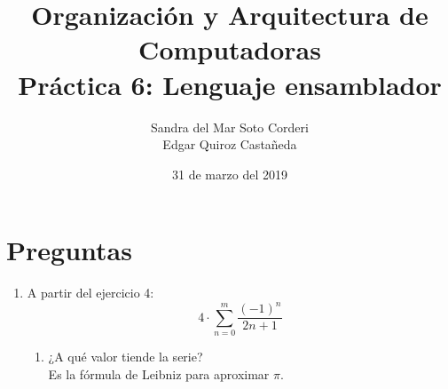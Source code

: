 \documentclass{article}
\begin{document}
    \title{
        Organización y Arquitectura de Computadoras \\
        Práctica 6: Lenguaje ensamblador \\
    }
    \date{
        31 de marzo del 2019
    }
    \author{
        Sandra del Mar Soto Corderi \\
        Edgar Quiroz Castañeda
    }
    \maketitle

    \section{Preguntas}
    \begin{enumerate}
        \item {
        	A partir del ejercicio 4:
            \[4\cdot\sum_{n=0}^{m}{\frac{(-1)^{n}}{2n+1}}\]
            \begin{enumerate}
                \item ¿A qué valor tiende la serie?\\
                Es la fórmula de Leibniz\cite{wolfram pi} para aproximar $\pi$.
                

\end{enumerate}}
\end{enumerate}
\end{document}
